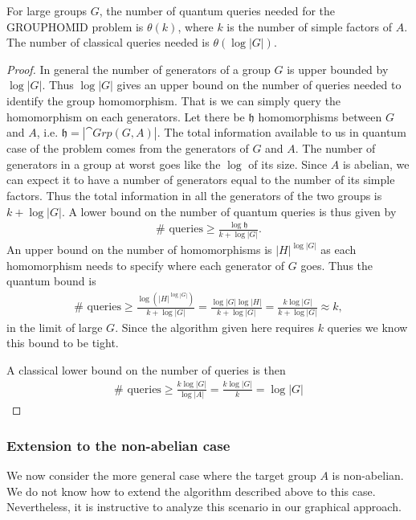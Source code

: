 \begin{theorem}
For large groups $G$, the number of quantum queries needed for the GROUPHOMID problem is $\theta(k)$, where $k$ is the number of simple factors of $A$. The number of classical queries needed is $\theta(\log|G|)$.
\end{theorem}

\begin{proof}
In general the number of generators of a group $G$ is upper bounded by $\log |G|$. Thus $\log|G|$ gives an upper bound on the number of queries needed to identify the group homomorphism. That is we can simply query the homomorphism on each generators. Let there be $\mathfrak{h}$ homomorphisms between $G$ and $A$, i.e. $\mathfrak{h}=|\cat{Grp}(G,A)|$. The total information available to us in quantum case of the problem comes from the generators of $G$ and $A$. The number of generators in a group at worst goes like the $\log$ of its size. Since $A$ is abelian, we can expect it to have a number of generators equal to the number of its simple factors. Thus the total information in all the generators of the two groups is $k+\log|G|$. A lower bound on the number of quantum queries is thus given by 
\begin{align}
\#\mbox{ queries} \ge\frac{\log \mathfrak{h}}{k+\log|G|}.
\end{align}
An  upper bound on the number of homomorphisms is $|H|^{\log|G|}$ as each homomorphism needs to specify where each generator of $G$ goes. Thus the quantum bound is 
\begin{align}
\#\mbox{ queries} \ge \frac{\log\left(|H|^{\log|G|}\right)}{k+\log|G|} = \frac{\log|G|\log|H|}{k+\log|G|} = \frac{k\log|G|}{k+\log|G|} \approx k,
\end{align}
in the limit of large $G$. Since the algorithm given here requires $k$ queries we know this bound to be tight.

A classical lower bound on the number of queries is then
\begin{align}
\#\mbox{ queries}\ge \frac{k\log|G|}{\log|A|} = \frac{k\log|G|}{k} = \log|G|
\end{align}
\end{proof}

\subsubsection*{Extension to the non-abelian case}
We now consider the more general case where the target group $A$ is non-abelian. We do not know how to extend the algorithm described above to this case.  Nevertheless, it is instructive to analyze this scenario in our graphical approach. 

